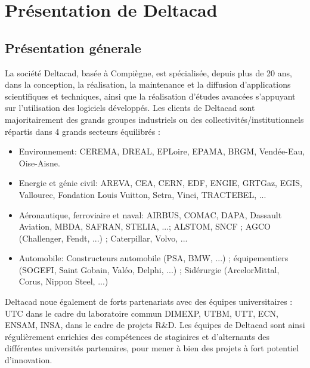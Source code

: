 \chapter{Présentation de Deltacad}
\section{Présentation génerale}
La société Deltacad, basée à Compiègne, est spécialisée, depuis plus de 20 ans, dans la conception, la réalisation, la maintenance et la diffusion d'applications scientifiques et techniques, ainsi que la réalisation d'études avancées s'appuyant sur l'utilisation des logiciels développés.
Les clients de Deltacad sont majoritairement des grands groupes industriels ou des collectivités/institutionnels répartis dans 4 grands secteurs équilibrés :
\begin{itemize}
\item Environnement: CEREMA, DREAL, EPLoire, EPAMA, BRGM, Vendée-Eau, 
Oise-Aisne.
\item Energie et génie civil: AREVA, CEA, CERN, EDF, ENGIE, GRTGaz, EGIS,
Vallourec, Fondation Louis Vuitton, Setra, Vinci, TRACTEBEL, ...
\item Aéronautique, ferroviaire et naval: AIRBUS,
COMAC, DAPA, Dassault Aviation, MBDA, SAFRAN, STELIA, ...; ALSTOM,
SNCF ; AGCO (Challenger, Fendt, ...) ; Caterpillar, Volvo, ...
\item Automobile: Constructeurs automobile (PSA, BMW, ...) ; équipementiers 
(SOGEFI, Saint Gobain, Valéo, Delphi, ...) ; Sidérurgie (ArcelorMittal, Corus, Nippon Steel, ...) 
\end{itemize}
Deltacad noue également de forts partenariats avec des équipes universitaires : UTC dans le cadre du laboratoire commun DIMEXP, UTBM, UTT, ECN, ENSAM, INSA, dans le cadre de projets R\&D. 
Les équipes de Deltacad sont ainsi régulièrement enrichies des compétences de stagiaires et d'alternants des différentes universités partenaires, pour mener à bien des projets à fort potentiel d'innovation.

\newpage
